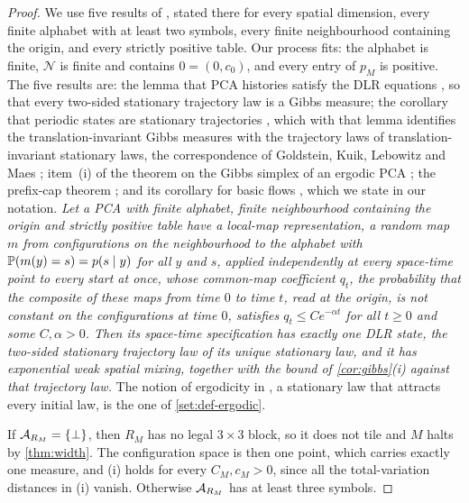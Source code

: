 \begin{proof}
We use five results of \cite{DM26}, stated there for every spatial dimension, every finite alphabet with at least two symbols, every finite neighbourhood containing the origin, and every strictly positive table. Our process fits: the alphabet is finite, $\mathcal N$ is finite and contains $0=(0,c_0)$, and every entry of $p_M$ is positive. The five results are: the lemma that PCA histories satisfy the DLR equations \cite[Lemma~2.4]{DM26}, so that every two-sided stationary trajectory law is a Gibbs measure; the corollary that periodic states are stationary trajectories \cite[Corollary~10.4]{DM26}, which with that lemma identifies the translation-invariant Gibbs measures with the trajectory laws of translation-invariant stationary laws, the correspondence of Goldstein, Kuik, Lebowitz and Maes \cite{GKLM89}; item~(i) of the theorem on the Gibbs simplex of an ergodic PCA \cite[Theorem~10.10]{DM26}; the prefix-cap theorem \cite[Theorem~13.3]{DM26}; and its corollary for basic flows \cite[Corollary~13.7]{DM26}, which we state in our notation. \emph{Let a PCA with finite alphabet, finite neighbourhood containing the origin and strictly positive table have a local-map representation, a random map $m$ from configurations on the neighbourhood to the alphabet with $\mathbb{P}(m(y)=s)=p(s\mid y)$ for all $y$ and $s$, applied independently at every space-time point to every start at once, whose common-map coefficient $q_t$, the probability that the composite of these maps from time $0$ to time $t$, read at the origin, is not constant on the configurations at time $0$, satisfies $q_t\le Ce^{-\alpha t}$ for all $t\ge0$ and some $C,\alpha>0$. Then its space-time specification has exactly one DLR state, the two-sided stationary trajectory law of its unique stationary law, and it has exponential weak spatial mixing, together with the bound of \cref{cor:gibbs}(i) against that trajectory law.} The notion of ergodicity in \cite{DM26}, a stationary law that attracts every initial law, is the one of \cref{set:def-ergodic}.

If $\mathcal{A}_{R_M}=\{\bot\}$, then $R_M$ has no legal $3\times3$ block, so it does not tile and $M$ halts by \cref{thm:width}. The configuration space is then one point, which carries exactly one measure, and (i) holds for every $C_M,c_M>0$, since all the total-variation distances in (i) vanish. Otherwise $\mathcal{A}_{R_M}$ has at least three symbols.


\end{proof}
